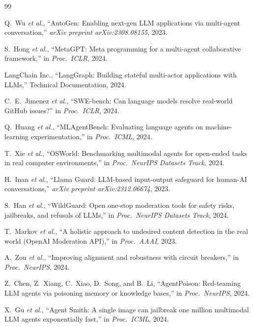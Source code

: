 \documentclass[12pt,a4paper]{article}
\theoremstyle{definition}
\theoremstyle{remark}
\begin{document}
\begin{thebibliography}{99}

Q.~Wu \emph{et al.}, ``{AutoGen}: Enabling next-gen LLM applications via multi-agent conversation,'' \emph{arXiv preprint arXiv:2308.08155}, 2023.

S.~Hong \emph{et al.}, ``{MetaGPT}: Meta programming for a multi-agent collaborative framework,'' in \emph{Proc.\ ICLR}, 2024.

LangChain Inc., ``{LangGraph}: Building stateful multi-actor applications with LLMs,'' Technical Documentation, 2024.

C.~E.~Jimenez \emph{et al.}, ``{SWE-bench}: Can language models resolve real-world {GitHub} issues?'' in \emph{Proc.\ ICLR}, 2024.

Q.~Huang \emph{et al.}, ``{MLAgentBench}: Evaluating language agents on machine-learning experimentation,'' in \emph{Proc.\ ICML}, 2024.

T.~Xie \emph{et al.}, ``{OSWorld}: Benchmarking multimodal agents for open-ended tasks in real computer environments,'' in \emph{Proc.\ NeurIPS Datasets Track}, 2024.

H.~Inan \emph{et al.}, ``{Llama Guard}: LLM-based input-output safeguard for human-AI conversations,'' \emph{arXiv preprint arXiv:2312.06674}, 2023.

S.~Han \emph{et al.}, ``{WildGuard}: Open one-stop moderation tools for safety risks, jailbreaks, and refusals of LLMs,'' in \emph{Proc.\ NeurIPS Datasets Track}, 2024.

T.~Markov \emph{et al.}, ``A holistic approach to undesired content detection in the real world (OpenAI Moderation API),'' in \emph{Proc.\ AAAI}, 2023.

A.~Zou \emph{et al.}, ``Improving alignment and robustness with circuit breakers,'' in \emph{Proc.\ NeurIPS}, 2024.

Z.~Chen, Z.~Xiang, C.~Xiao, D.~Song, and B.~Li, ``{AgentPoison}: Red-teaming LLM agents via poisoning memory or knowledge bases,'' in \emph{Proc.\ NeurIPS}, 2024.

X.~Gu \emph{et al.}, ``Agent {Smith}: A single image can jailbreak one million multimodal LLM agents exponentially fast,'' in \emph{Proc.\ ICML}, 2024.


\end{thebibliography}
\end{document}
